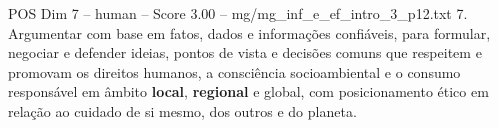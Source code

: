 \begin{textsample}{POS Dim 7 – human – Score 3.00 – mg/mg\_inf\_e\_ef\_intro\_3\_p12.txt}  \label{ex:f7_pos_015}
7.
Argumentar com base em fatos, dados e informações confiáveis, para formular, negociar e defender ideias, pontos de vista e decisões comuns que respeitem e promovam os direitos humanos, a consciência socioambiental e o consumo responsável em âmbito \textbf{local}, \textbf{regional} e global, com posicionamento ético em relação ao cuidado de si mesmo, dos outros e do planeta.

\end{textsample}
